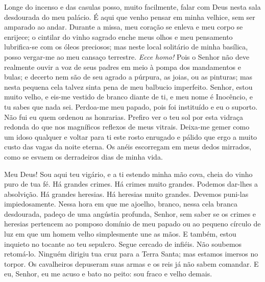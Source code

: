 Longe do incenso e das casulas posso, muito facilmente, falar com Deus
nesta sala desdourada do meu palácio.  É aqui que  venho pensar  em minha
velhice, sem ser amparado ao andar. Durante a missa, meu coração se enleva
e meu corpo se enrijece; o cintilar do vinho sagrado enche meus olhos e
meu pensamento lubrifica-se com os óleos preciosos; mas neste local
solitário de minha basílica, posso vergar-me ao meu cansaço terrestre.
\textit{Ecce homo!} Pois o Senhor não deve realmente ouvir a voz de seus
padres em meio à pompa dos mandamentos e bulas; e decerto nem são de seu
agrado a púrpura, as joias, ou as pinturas; mas nesta pequena cela talvez
sinta pena de meu balbucio imperfeito. Senhor, estou muito velho, e eis-me
vestido de branco diante de ti, e meu nome é Inocêncio, e tu sabes que
nada sei. Perdoa-me meu papado, pois foi instituído e eu o suporto. Não
fui eu quem ordenou as honrarias. Prefiro ver o teu sol por esta vidraça
redonda do que nos magníficos reflexos de meus vitrais. Deixa-me gemer
como um idoso qualquer e voltar para ti este rosto enrugado e pálido que
ergo a muito custo das vagas da noite eterna. Os anéis escorregam em meus
dedos mirrados, como se esvaem os derradeiros dias de minha vida.

Meu Deus! Sou aqui teu vigário, e a ti estendo minha mão cova, cheia do
vinho puro de tua fé. Há grandes crimes. Há crimes muito grandes. Podemos
dar-lhes a absolvição. Há grandes heresias. Há heresias muito grandes.
Devemos puni-las impiedosamente. Nessa hora em que me ajoelho, branco,
nessa cela branca desdourada, padeço de uma angústia profunda, Senhor, sem
saber se os crimes e heresias pertencem ao pomposo domínio de meu papado
ou ao pequeno círculo de luz em que um homem velho simplesmente une as
mãos. E também, estou inquieto no tocante ao teu sepulcro. Segue cercado
de infiéis. Não soubemos retomá-lo. Ninguém dirigiu tua cruz para a Terra
Santa; mas estamos imersos no torpor. Os cavalheiros depuseram suas armas
e os reis já não sabem comandar. E eu, Senhor, eu me acuso e bato no
peito: sou fraco e velho demais.

